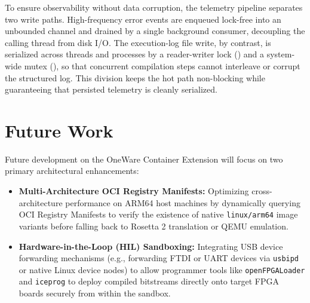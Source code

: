 To ensure observability without data corruption, the telemetry pipeline separates two write paths. High-frequency error events are enqueued lock-free into an unbounded channel and drained by a single background consumer, decoupling the calling thread from disk I/O. The execution-log file write, by contrast, is serialized across threads and processes by a reader-writer lock () and a system-wide mutex (), so that concurrent compilation steps cannot interleave or corrupt the structured log. This division keeps the hot path non-blocking while guaranteeing that persisted telemetry is cleanly serialized.

\section{Future Work}
Future development on the OneWare Container Extension will focus on two primary architectural enhancements:
\begin{itemize}
    \item \textbf{Multi-Architecture OCI Registry Manifests:} Optimizing cross-architecture performance on ARM64 host machines by dynamically querying OCI Registry Manifests to verify the existence of native \texttt{linux/arm64} image variants before falling back to Rosetta 2 translation or QEMU emulation.
    \item \textbf{Hardware-in-the-Loop (HIL) Sandboxing:} Integrating USB device forwarding mechanisms (e.g., forwarding FTDI or UART devices via \texttt{usbipd} or native Linux device nodes) to allow programmer tools like \texttt{openFPGALoader} and \texttt{iceprog} to deploy compiled bitstreams directly onto target FPGA boards securely from within the sandbox.
\end{itemize}
